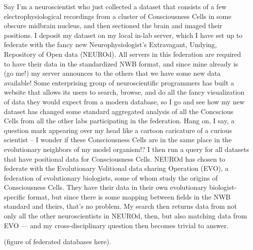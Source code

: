 \documentclass[11pt]{article}
\begin{document}
\begin{multicols}{2}
Say I'm a neuroscientist who just collected a dataset that consists of a
few electrophysiological recordings from a cluster of Consciousness
Cells in some obscure midbrain nucleus, and then sectioned the brain and
imaged their positions. I deposit my dataset on my local in-lab server,
which I have set up to federate with the fancy new Neurophysiologist's
Extravagant, Undying, Repository of Open data (NEUROd). All servers in
this federation are required to have their data in the standardized NWB
format, and since mine already is (go me!) my server announces to the
others that we have some new data available! Some enterprising group of
neuroscientific programmers has built a website that allows its users to
search, browse, and do all the fancy visualization of data they would
expect from a modern database, so I go and see how my new dataset has
changed some standard aggregated analysis of all the Concscious Cells
from all the other labs participating in the federation. Hang on, I say,
a question mark appearing over my head like a cartoon caricature of a
curious scientist -- I wonder if these Consciousness Cells are in the
same place in the evolutionary neighbors of my model organism!? I then
run a query for all datasets that have positional data for Consciousness
Cells. NEUROd has chosen to federate with the Evolutionary Volitional
data sharing Operation (EVO), a federation of evolutionary biologists,
some of whom study the origins of Consciousness Cells. They have their
data in their own evolutionary biologist-specific format, but since
there is some mapping between fields in the NWB standard and theirs,
that's no problem. My search then returns data from not only all the
other neuroscientists in NEUROd, then, but also matching data from EVO
--- and my cross-disciplinary question then becomes trivial to answer.

(figure of federated databases here).


\end{multicols}
\end{document}
